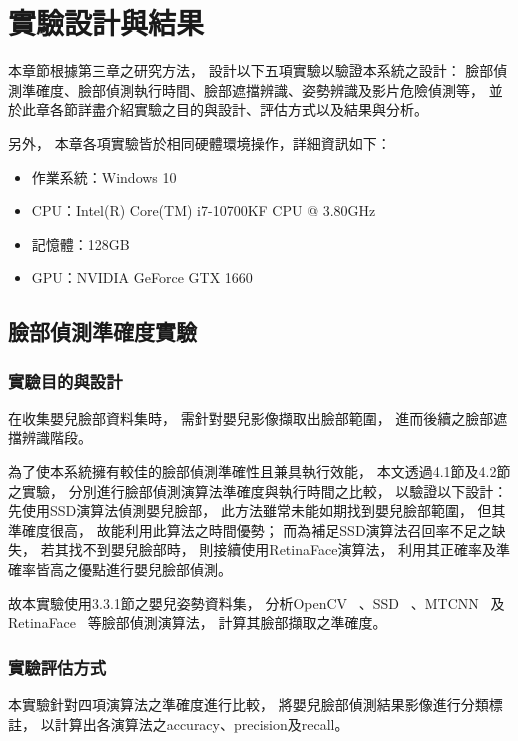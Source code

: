 \documentclass[class=NCU_thesis, crop=false]{standalone}
\begin{document}
\chapter{實驗設計與結果}
本章節根據第三章之研究方法，
設計以下五項實驗以驗證本系統之設計：
臉部偵測準確度、臉部偵測執行時間、臉部遮擋辨識、姿勢辨識及影片危險偵測等，
並於此章各節詳盡介紹實驗之目的與設計、評估方式以及結果與分析。

另外，
本章各項實驗皆於相同硬體環境操作，詳細資訊如下：
\begin{itemize}
    \item 作業系統：Windows 10
    \item CPU：Intel(R) Core(TM) i7-10700KF CPU @ 3.80GHz
    \item 記憶體：128GB
    \item GPU：NVIDIA GeForce GTX 1660
\end{itemize}

\section{臉部偵測準確度實驗}
\subsection{實驗目的與設計}
在收集嬰兒臉部資料集時，
需針對嬰兒影像擷取出臉部範圍，
進而後續之臉部遮擋辨識階段。

為了使本系統擁有較佳的臉部偵測準確性且兼具執行效能，
本文透過4.1節及4.2節之實驗，
分別進行臉部偵測演算法準確度與執行時間之比較，
以驗證以下設計：
先使用SSD演算法偵測嬰兒臉部，
此方法雖常未能如期找到嬰兒臉部範圍，
但其準確度很高，
故能利用此算法之時間優勢；
而為補足SSD演算法召回率不足之缺失，
若其找不到嬰兒臉部時，
則接續使用RetinaFace演算法，
利用其正確率及準確率皆高之優點進行嬰兒臉部偵測。

故本實驗使用3.3.1節之嬰兒姿勢資料集，
分析OpenCV~\cite{goyal_face_2017}
、SSD~\cite{ye_face_2021}
、MTCNN~\cite{zhang_joint_2016}
及RetinaFace~\cite{deng_retinaface_2020}
等臉部偵測演算法，
計算其臉部擷取之準確度。

\subsection{實驗評估方式}
本實驗針對四項演算法之準確度進行比較，
將嬰兒臉部偵測結果影像進行分類標註，
以計算出各演算法之accuracy、precision及recall。
\end{document}
